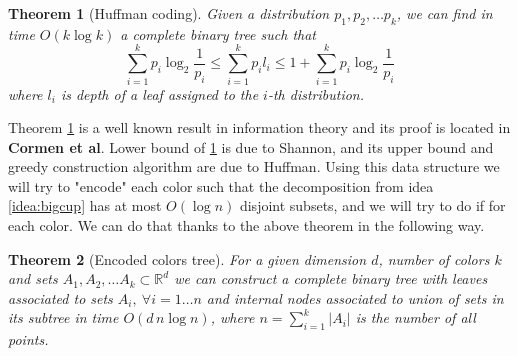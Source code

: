 \documentclass{article}
\newcommand\todo[1]{{\bf \textcolor{bordeaux}{#1}}}
\newtheorem{theorem}{Theorem}
\begin{document}
\begin{theorem}[Huffman coding]\label{tm:huff}
Given a distribution $p_1, p_2, \dots p_k$, we can find in time $O(k \log k)$ a complete binary tree such that
$$ \sum \limits_{i = 1}^k p_i \log_2 \frac{1}{p_i} \leq \sum \limits_{i = 1}^k p_i l_i \leq 1 + \sum \limits_{i = 1}^k p_i \log_2 \frac{1}{p_i} $$
where $l_i$ is depth of a leaf assigned to the $i$-th distribution.
\end{theorem}
Theorem \ref{tm:huff} is a well known result in information theory and its proof is located in \todo{Cormen et al}.
Lower bound of \ref{tm:huff} is due to Shannon, and its upper bound and greedy construction algorithm are due to Huffman.
Using this data structure we will try to "encode" each color such that the decomposition from idea \ref{idea:bigcup} has at most $O\left(\log n\right)$ disjoint subsets, and we will try to do if for each color.
We can do that thanks to the above theorem in the following way.
\begin{theorem}[Encoded colors tree]\label{tm:logn}
For a given dimension $d$, number of colors $k$ and sets $A_1, A_2, \dots A_k \subset \mathbb{R}^d$ we can construct a complete binary tree with leaves associated to sets
$A_i,\ \forall i = 1 \dots n$ and internal nodes associated to union of sets in its subtree in time $O\left(d\, n \log n\right)$, where $n = \sum \limits_{i = 1}^k |A_i|$ is the number of all points.
\end{theorem}
\end{document}
